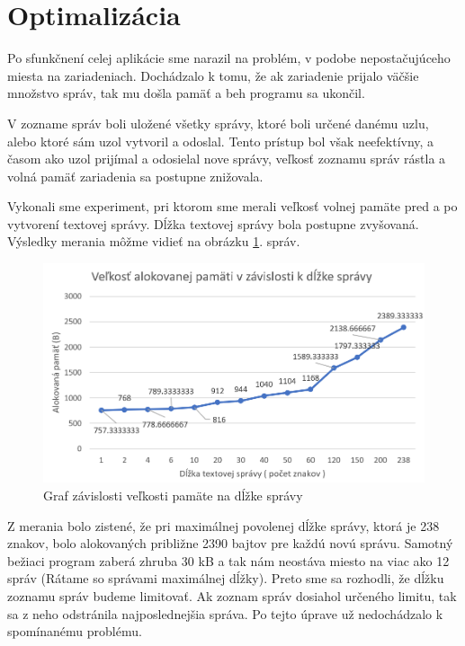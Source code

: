 \documentclass[slovak,master]{diploma}
\begin{document}
\newpage
\section{Optimalizácia}
Po sfunkčnení celej aplikácie sme narazil na problém, v podobe nepostačujúceho miesta na zariadeniach. Dochádzalo k tomu, že ak zariadenie prijalo 
väčšie množstvo správ, tak mu došla pamäť a beh programu sa ukončil.

V zozname správ boli uložené všetky správy, ktoré boli určené danému uzlu, alebo ktoré sám uzol vytvoril a odoslal. Tento prístup bol však neefektívny, a časom ako 
uzol prijímal a odosielal nove správy, veľkosť zoznamu správ rástla a volná pamäť zariadenia sa postupne znižovala.

Vykonali sme experiment, pri ktorom sme merali veľkosť volnej pamäte pred a po vytvorení textovej správy. Dĺžka textovej správy bola postupne zvyšovaná. Výsledky merania 
môžme vidieť na obrázku \ref{fig:memoryUsage}.
správ.
\begin{figure}[h!]
  \begin{center}
    \includegraphics[width=1\textwidth]{Figures/memAnalyze.png}
  \end{center}
  \caption{Graf závislosti veľkosti pamäte na dĺžke správy}
  \label{fig:memoryUsage}
\end{figure}

Z merania bolo zistené, že pri maximálnej povolenej dĺžke správy, ktorá je 238 znakov, bolo alokovaných približne 2390 bajtov pre každú novú správu. Samotný bežiaci program 
zaberá zhruba 30 kB a tak nám neostáva miesto na viac ako 12 správ (Rátame so správami maximálnej dĺžky). 
Preto sme sa rozhodli, že dĺžku zoznamu správ budeme limitovať. Ak zoznam správ dosiahol určeného limitu, tak sa z neho odstránila najposlednejšia správa.
Po tejto úprave už nedochádzalo k spomínanému problému.
\end{document}
